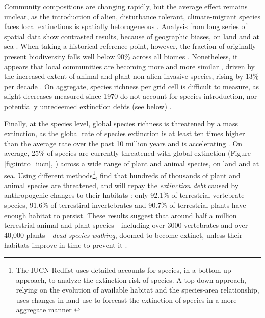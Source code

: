 Community compositions are changing rapidly, but the average effect remains unclear, as the introduction of alien, disturbance tolerant, climate-migrant species faces local extinctions is spatially hetorogeneous \citep{cardinale_local_2018}. Analysis from long series of spatial data show contrasted results, because of geographic biases, on land and at sea \citep{dornelas_assemblage_2014, gonzales_estimating_2016}. When taking a historical reference point, however, the fraction of originally present biodiversity falls well below 90\% across all biomes \citep{Hill311787}. Nonetheless, it appears that local communities are becoming more and more similar \citep{mckinney_1999_biotic}, driven by the increased extent of animal and plant non-alien invasive species, rising by 13\% per decade \citep{seebens_no_2017}. 
On aggregate, species richness per grid cell is difficult to measure, as slight decreases measured since 1970 \citep{Kim300632} do not account for species introduction, nor potentially unredeemed extinction debts (see below) \citep{JACKSON2010153}.

Finally, at the species level, global species richness is  threatened by a mass extinction, as the global rate of species extinction is at least ten times higher than the average rate over the past 10 million years and is accelerating \citep{barnosky_has_2011, ceballos_accelerated_2015}. On average, 25\% of species are currently threatened with global extinction (Figure \ref{fig:intro_iucn}, \cite{IUCN_redlist_2024}) across a wide range of plant and animal species, on land and at sea. Using different methods\footnote{ The IUCN Redlist uses detailed accounts for species, in a bottom-up approach, to analyze the extinction risk of species. A top-down approach, relying on the evolution of available habitat and the species-area relationship, uses changes in land use to forecast the extinction of species in a more aggregate manner \citep{Diamond1972BiogeographicKE}}, \cite{Hoskins309377} find that hundreds of thousands of plant and animal species are threatened, and will repay the \textit{extinction debt} caused by anthropogenic changes to their habitats : only 92.1\% of terrestrial vertebrate species, 91.6\% of terrestiral invertebrates and 90.7\% of terrestrial plants have enough habitat to persist. These results suggest that around half a million terrestrial animal and plant species - including over 3000 vertebrates and over 40,000 plants - \textit{dead species walking}, doomed to become extinct, unless their habitats improve in time to prevent it \citep{ipbes_2022_6417333}.

